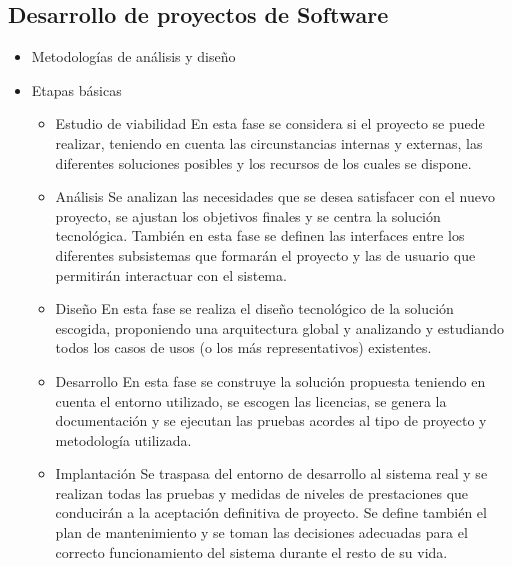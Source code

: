 \subsection {Desarrollo de proyectos de Software}
\begin{itemize}
	\item Metodologías de análisis y diseño
	\item Etapas básicas
	\begin{itemize}
	\item Estudio de viabilidad
	\subitem En esta fase se considera si el proyecto se
puede realizar, teniendo en cuenta las circunstancias internas y
externas, las diferentes soluciones posibles y los recursos de los
cuales se dispone.
	\end{itemize}
	\begin{itemize}
	\item Análisis
	\subitem Se analizan las necesidades que se desea satisfacer con
el nuevo proyecto, se ajustan los objetivos finales y se centra la solución
tecnológica. También en esta fase se definen las interfaces
entre los diferentes subsistemas que formarán el proyecto y las de
usuario que permitirán interactuar con el sistema.
\end{itemize}
	\begin{itemize}
	\item Diseño
	\subitem En esta fase se realiza el diseño tecnológico de la solución
escogida, proponiendo una arquitectura global y analizando
y estudiando todos los casos de usos (o los más representativos)
existentes.
\end{itemize}
\begin{itemize}
	\item  Desarrollo
	\subitem En esta fase se construye la solución propuesta teniendo
en cuenta el entorno utilizado, se escogen las licencias, se
genera la documentación y se ejecutan las pruebas acordes al
tipo de proyecto y metodología utilizada.
\end{itemize}
	\begin{itemize}
	\item Implantación
	\subitem Se traspasa del entorno de desarrollo al sistema
real y se realizan todas las pruebas y medidas de niveles de prestaciones que conducirán a la aceptación definitiva de proyecto. Se define también el plan de mantenimiento y se toman las decisiones adecuadas para el correcto funcionamiento del sistema durante el resto de su vida.
	\end{itemize}
\end{itemize}


